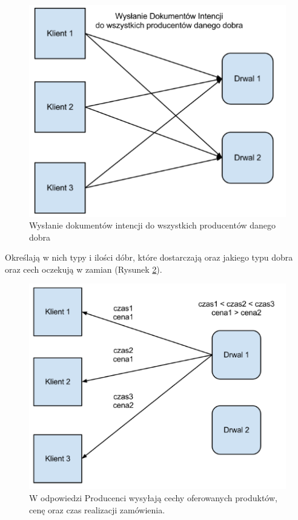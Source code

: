 \documentclass[a4paper,12pt]{article}
\begin{document}
\begin{figure}[!h]
\centering
\includegraphics[scale=1]{gfx/PlatformaWymianyDobr-img2.png}
\caption{Wysłanie dokumentów intencji do wszystkich producentów danego dobra}
\label{oper1}
\end{figure}

Określają w nich typy i ilości dóbr, które dostarczają oraz jakiego typu dobra oraz cech oczekują w zamian (Rysunek \ref{oper2}).

\begin{figure}[!h]
\centering
\includegraphics[scale=1]{gfx/PlatformaWymianyDobr-img3.png}
\caption{W odpowiedzi Producenci wysyłają cechy oferowanych produktów, cenę oraz czas realizacji zamówienia.}
\label{oper2}
\end{figure}
\end{document}
